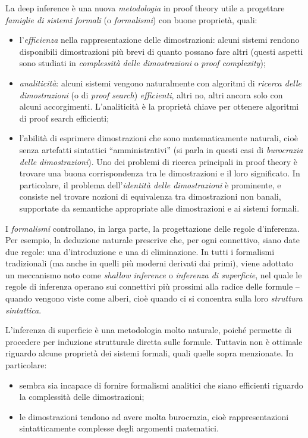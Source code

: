 \documentclass[12pt,a4paper,openright,twoside]{report}
\begin{document}
La deep inference \`e una nuova \emph{metodologia} in proof theory utile a progettare \emph{famiglie di sistemi formali} (o \emph{formalismi}) con buone propriet\`a, quali:
\begin{itemize}
	\item l'\emph{efficienza} nella rappresentazione delle dimostrazioni: alcuni sistemi rendono disponibili dimostrazioni pi\`u brevi di quanto possano fare altri (questi aspetti sono studiati in \emph{complessit\`a delle dimostrazioni} o \emph{proof complexity});
	\item \emph{analiticit\`a}: alcuni sistemi vengono naturalmente con algoritmi di \emph{ricerca delle dimostrazioni} (o di \emph{proof search}) \emph{efficienti}, altri no, altri ancora solo con alcuni accorgimenti. L'analiticit\`a \`e la propriet\`a chiave per ottenere algoritmi di proof search efficienti;
	\item l'abilit\`a di esprimere dimostrazioni che sono matematicamente naturali, cio\`e senza artefatti sintattici ``amministrativi'' (si parla in questi casi di \emph{burocrazia delle dimostrazioni}). Uno dei problemi di ricerca principali in proof theory \`e trovare una buona corrispondenza tra le dimostrazioni e il loro significato. In particolare, il problema dell'\emph{identit\`a delle dimostrazioni} \`e prominente, e consiste nel trovare nozioni di equivalenza tra dimostrazioni non banali, supportate da semantiche appropriate alle dimostrazioni e ai sistemi formali.
\end{itemize}

I \emph{formalismi} controllano, in larga parte, la progettazione delle regole d'inferenza. Per esempio, la deduzione naturale prescrive che, per ogni connettivo, siano date due regole: una d'introduzione e una di eliminazione. In tutti i formalismi tradizionali (ma anche in quelli pi\`u moderni derivati dai primi), viene adottato un meccanismo noto come \emph{shallow inference} o \emph{inferenza di superficie}, nel quale le regole di inferenza operano sui connettivi pi\`u prossimi alla radice delle formule -- quando vengono viste come alberi, cio\`e quando ci si concentra sulla loro \emph{struttura sintattica}. 

L'inferenza di superficie \`e una metodologia molto naturale, poich\'e permette di procedere per induzione strutturale diretta sulle formule. Tuttavia non \`e ottimale riguardo alcune propriet\`a dei sistemi formali, quali quelle sopra menzionate. In particolare:
\begin{itemize}
	\item sembra sia incapace di fornire formalismi analitici che siano efficienti riguardo la complessit\`a delle dimostrazioni;
	\item le dimostrazioni tendono ad avere molta burocrazia, cio\`e rappresentazioni sintatticamente complesse degli argomenti matematici.
\end{itemize}
\end{document}
